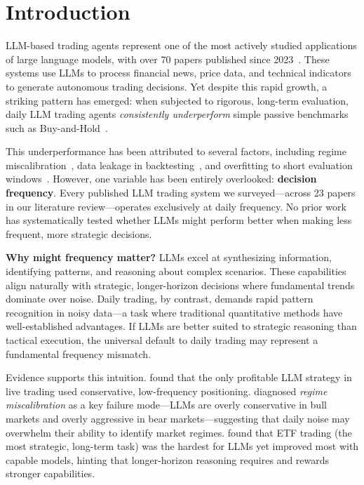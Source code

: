 \section{Introduction}
\label{sec:introduction}

LLM-based trading agents represent one of the most actively studied applications of large language models, with over 70 papers published since 2023~\citep{ding2024survey}. These systems use LLMs to process financial news, price data, and technical indicators to generate autonomous trading decisions. Yet despite this rapid growth, a striking pattern has emerged: when subjected to rigorous, long-term evaluation, daily LLM trading agents \emph{consistently underperform} simple passive benchmarks such as Buy-and-Hold~\citep{li2026finsaber,deepfund2025}.

This underperformance has been attributed to several factors, including regime miscalibration~\citep{li2026finsaber}, data leakage in backtesting~\citep{deepfund2025}, and overfitting to short evaluation windows~\citep{ding2024survey}. However, one variable has been entirely overlooked: \textbf{decision frequency}. Every published LLM trading system we surveyed---across 23 papers in our literature review---operates exclusively at daily frequency. No prior work has systematically tested whether LLMs might perform better when making less frequent, more strategic decisions.

{\bf Why might frequency matter?} LLMs excel at synthesizing information, identifying patterns, and reasoning about complex scenarios. These capabilities align naturally with strategic, longer-horizon decisions where fundamental trends dominate over noise. Daily trading, by contrast, demands rapid pattern recognition in noisy data---a task where traditional quantitative methods have well-established advantages. If LLMs are better suited to strategic reasoning than tactical execution, the universal default to daily trading may represent a fundamental frequency mismatch.

Evidence supports this intuition. \citet{deepfund2025} found that the only profitable LLM strategy in live trading used conservative, low-frequency positioning. \citet{li2026finsaber} diagnosed \emph{regime miscalibration} as a key failure mode---LLMs are overly conservative in bull markets and overly aggressive in bear markets---suggesting that daily noise may overwhelm their ability to identify market regimes. \citet{li2024investorbench} found that ETF trading (the most strategic, long-term task) was the hardest for LLMs yet improved most with capable models, hinting that longer-horizon reasoning requires and rewards stronger capabilities.

